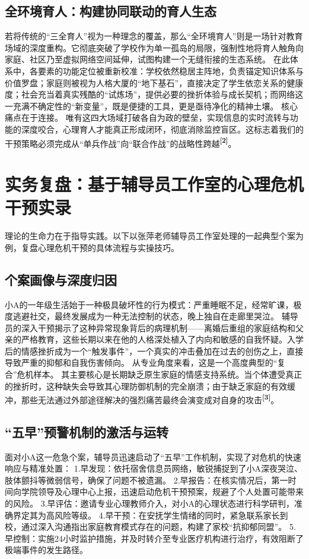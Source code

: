 \documentclass[a4paper,12pt]{ctexart}
\newcommand{\upcite}[1]{\textbf{\textsuperscript{[#1]}}}
\begin{document}
\subsection{全环境育人：构建协同联动的育人生态}
若将传统的“三全育人”视为一种理念的覆盖，那么“全环境育人”则是一场针对教育场域的深度重构。它彻底突破了学校作为单一孤岛的局限，强制性地将育人触角向家庭、社区乃至虚拟网络空间延伸，试图构建一个无缝衔接的生态系统。
在此体系中，各要素的功能定位被重新校准：学校依然稳居主阵地，负责锚定知识体系与价值罗盘；家庭则被视为人格大厦的“地下基石”，直接决定了学生依恋关系的健康度；社会充当着真实残酷的“试炼场”，提供必要的挫折体验与成长契机；而网络这一充满不确定性的“新变量”，既是便捷的工具，更是亟待净化的精神土壤。
核心痛点在于连接。
唯有这四大场域打破各自为政的壁垒，实现信息的实时流转与功能的深度咬合，心理育人才能真正形成闭环，彻底消除监控盲区。这标志着我们的干预策略必须完成从“单兵作战”向“联合作战”的战略性跨越\upcite{2}。

\section{实务复盘：基于辅导员工作室的心理危机干预实录}

理论的生命力在于指导实践。以下以张萍老师辅导员工作室处理的一起典型个案为例，复盘心理危机干预的具体流程与实操技巧。

\subsection{个案画像与深度归因}
小A的一年级生活始于一种极具破坏性的行为模式：严重睡眠不足，经常旷课，极度逃避社交，最终发展成为一种无法控制的状态，晚上独自在走廊里哭泣。
辅导员的深入干预揭示了这种异常现象背后的病理机制——离婚后重组的家庭结构和父亲的严格教育，这些长期以来在他的人格深处植入了内向和敏感的自我怀疑。入学后的情感挫折成为一个“触发事件”，一个真实的冲击叠加在过去的创伤之上，直接导致严重的抑郁和自我伤害倾向。
从专业角度来看，这是一个高度典型的“复合”危机样本。
其主要核心是长期缺乏原生家庭的情感支持系统。当个体遭受真正的挫折时，这种缺失会导致其心理防御机制的完全崩溃；由于缺乏家庭的有效缓冲，那些无法通过外部途径解决的强烈痛苦最终会演变成对自身的攻击\upcite{3}。

\subsection{“五早”预警机制的激活与运转}
面对小A这一危急个案，辅导员迅速启动了“五早”工作机制，实现了对危机的快速响应与精准处置：
1.早发现：依托宿舍信息员网络，敏锐捕捉到了小A深夜哭泣、肢体颤抖等微弱信号，确保了问题不被遗漏。
2.早报告：在核实情况后，第一时间向学院领导及心理中心上报，迅速启动危机干预预案，规避了个人处置可能带来的风险。
3.早评估：邀请专业心理教师介入，对小A的心理状态进行科学研判，准确界定其为高风险等级。
4.早干预：在安抚学生情绪的同时，紧急联系家长到校，通过深入沟通指出家庭教育模式存在的问题，构建了家校“抗抑郁同盟”。
5.早控制：实施24小时监护措施，并及时转介至专业医疗机构进行治疗，有效阻断了极端事件的发生路径。
\end{document}
